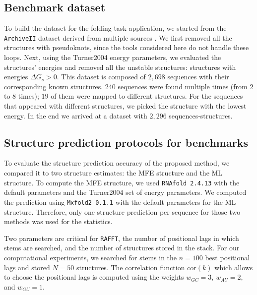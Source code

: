 \subsection*{Benchmark dataset}
To build the dataset for the folding task application, we started from the \texttt{ArchiveII} dataset derived from multiple sources \cite{andronescu08_rna_stran,brown98_ribon_p_datab,bellaousov10_probk,daub08_rna_wikip,damberger94_compar_datab_group_i_intron_struc,zwieb00_tmrdb,zwieb03_tmrdb,waring84_asses_model_intron_rna_secon,specht97_compil_rrna_rrna_gene_sequen,sprinzl98_compil_trna_sequen_sequen_trna_genes,sloma16_exact_calcul_loop_format_probab,schnare96_compr_compar_struc_charac_eukar,mathews99_expan_sequen_depen_therm_param,samuelsson99_signal_recog_partic_datab_srpdb,gutell93_compil_large_subun_like_ribos_rna_struc,gutell94_collec_small_subun_like_ribos_rna_struc,gardner09_rfam}. We first removed all the structures with pseudoknots, since the tools considered here do not handle these loops. Next, using the Turner2004 energy parameters, we evaluated the structures' energies and removed all the unstable structures: structures with energies $\Delta G_s > 0$. This dataset is composed of $2,698$ sequences with their corresponding known structures. $240$ sequences were found multiple times (from $2$ to $8$ times); $19$ of them were mapped to different structures. For the sequences that appeared with different structures, we picked the structure with the lowest energy. In the end we arrived at a dataset with $2,296$ sequences-structures.

\subsection*{Structure prediction protocols for benchmarks}
To evaluate the structure prediction accuracy of the proposed method, we compared it to two structure estimates: the MFE structure and the ML structure. To compute the MFE structure, we used \texttt{RNAfold 2.4.13} with the default parameters and the Turner2004 set of energy parameters. We computed the prediction using \texttt{Mxfold2 0.1.1} with the default parameters for the ML structure. Therefore, only one structure prediction per sequence for those two methods was used for the statistics.

Two parameters are critical for \texttt{RAFFT}, the number of positional lags in which stems are searched, and the number of structures stored in the stack. For our computational experiments, we searched for stems in the $n=100$ best positional lags and stored $N=50$ structures. The correlation function \(\text{cor}(k)\) which allows to choose the positional lags is computed using the weights \(w_{GC}=3\), \(w_{AU}=2\), and \(w_{GU}=1\).

